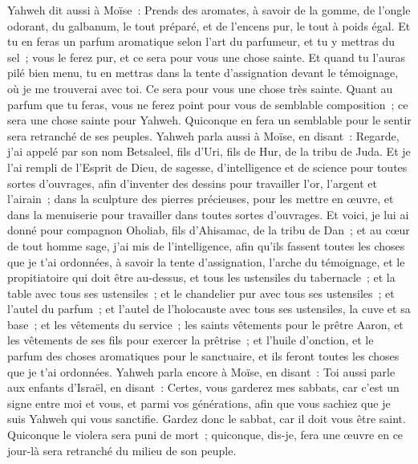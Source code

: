 \begin{multicols}{2}
Yahweh dit aussi à Moïse~: Prends des aromates, à savoir de la gomme, de l'ongle odorant, du galbanum, le tout préparé, et de l'encens pur, le tout à poids égal.
Et tu en feras un parfum aromatique selon l'art du parfumeur, et tu y mettras du sel~; vous le ferez pur, et ce sera pour vous une chose sainte.
Et quand tu l'auras pilé bien menu, tu en mettras dans la tente d'assignation devant le témoignage, où je me trouverai avec toi. Ce sera pour vous une chose très sainte.
Quant au parfum que tu feras, vous ne ferez point pour vous de semblable composition~; ce sera une chose sainte pour Yahweh.
Quiconque en fera un semblable pour le sentir sera retranché de ses peuples.
\VerseOne{}Yahweh parla aussi à Moïse, en disant~:
Regarde, j'ai appelé par son nom Betsaleel, fils d'Uri, fils de Hur, de la tribu de Juda.
Et je l'ai rempli de l'Esprit de Dieu, de sagesse, d'intelligence et de science pour toutes sortes d'ouvrages,
afin d'inventer des dessins pour travailler l'or, l'argent et l'airain~;
dans la sculpture des pierres précieuses, pour les mettre en œuvre, et dans la menuiserie pour travailler dans toutes sortes d'ouvrages.
Et voici, je lui ai donné pour compagnon Oholiab, fils d'Ahisamac, de la tribu de Dan~; et au cœur de tout homme sage, j'ai mis de l'intelligence, afin qu'ils fassent toutes les choses que je t'ai ordonnées,
à savoir la tente d'assignation, l'arche du témoignage, et le propitiatoire qui doit être au-dessus, et tous les ustensiles du tabernacle~;
et la table avec tous ses ustensiles~; et le chandelier pur avec tous ses ustensiles~; et l'autel du parfum~;
et l'autel de l'holocauste avec tous ses ustensiles, la cuve et sa base~;
et les vêtements du service~; les saints vêtements pour le prêtre Aaron, et les vêtements de ses fils pour exercer la prêtrise~;
et l'huile d'onction, et le parfum des choses aromatiques pour le sanctuaire, et ils feront toutes les choses que je t'ai ordonnées.
Yahweh parla encore à Moïse, en disant~:
Toi aussi parle aux enfants d'Israël, en disant~: Certes, vous garderez mes sabbats, car c'est un signe entre moi et vous, et parmi vos générations, afin que vous sachiez que je suis Yahweh qui vous sanctifie.
Gardez donc le sabbat, car il doit vous être saint. Quiconque le violera sera puni de mort~; quiconque, dis-je, fera une œuvre en ce jour-là sera retranché du milieu de son peuple.

\end{multicols}
